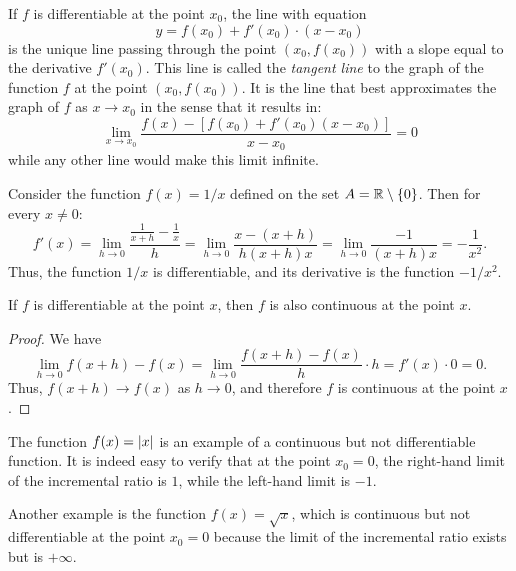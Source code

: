 If $f$ is differentiable at the point $x_0$,
the line with equation 
%
\begin{equation}\label{eq:retta_tangente}
  y = f(x_0) + f'(x_0) \cdot (x-x_0)  
\end{equation}
is the unique line passing through the point $(x_0,f(x_0))$ 
with a slope equal to the derivative $f'(x_0)$.
This line is called the \emph{tangent line}
%
%
to the graph of the function $f$ at the point $(x_0,f(x_0))$.
It is the line that best approximates the graph of $f$ 
as $x\to x_0$ in the sense that it results in:
\[
  \lim_{x\to x_0} \frac{f(x) - [f(x_0)+f'(x_0)(x-x_0)]}{x-x_0} = 0
\]
while any other line would make this limit infinite.

\begin{example}%
\label{ex:derivata_reciproco}%
\mymark{**}%
Consider the function $f(x) = 1/x$ defined on the set $A = {\mathbb R} \setminus
{\left\{ 0 \right\}}$. Then for every $x\neq 0$:
\[
  f'(x) = \lim_{h\to 0} \frac{\frac{1}{x+h} - \frac{1}{x}}{h}
        = \lim_{h\to 0} \frac{x - (x+h)}{h(x+h)x}
        = \lim_{h\to 0} \frac{-1}{(x+h)x} = -\frac{1}{x^2}.
\]
Thus, the function $1/x$ is differentiable, and its derivative is the function
$-1/x^2$.
\end{example}

\begin{theorem}
\mymark{***}
If $f$ is differentiable at the point $x$, then $f$ is also continuous at the
point $x$.
\end{theorem}
%
\begin{proof}
\mymark{***}
We have
\[
  \lim_{h\to 0} f(x+h) - f(x) = \lim_{h\to 0} \frac{f(x+h) - f(x)}{h} \cdot h
  = f'(x) \cdot 0 = 0.
\]
Thus, $f(x+h)\to f(x)$ as $h\to 0$, and therefore $f$ is continuous at the point
$x$.
\end{proof}

\begin{example}
\mymark{***}
The function $f(x) = {\left|x\right|}$ is an example of a continuous but not
differentiable function. It is indeed easy to verify that at the point $x_0=0$,
the
right-hand limit of the incremental ratio is $1$, while the left-hand limit is
$-1$.

Another example is the function $f(x) = \sqrt{x}$, which is continuous but not
differentiable at the point $x_0=0$ because the limit of the incremental ratio
exists but is $+\infty$.
\end{example}

